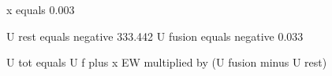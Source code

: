 x equals 0.003  

U rest equals negative 333.442  
U fusion equals negative 0.033  

U tot equals U f plus x EW multiplied by (U fusion minus U rest)